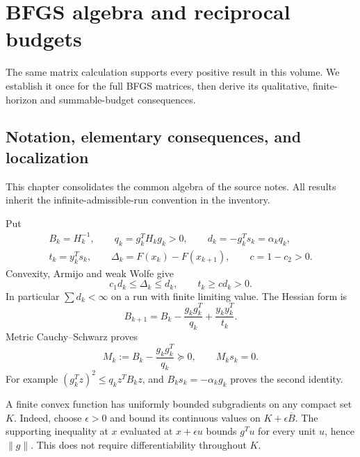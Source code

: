 \chapter{BFGS algebra and reciprocal budgets}\label{comp:M}\label{M:chapter}
\renewcommand{\ModuleTag}{2}
The same matrix calculation supports every positive result in this volume. We establish it once for the full BFGS matrices, then derive its qualitative, finite-horizon and summable-budget consequences.


\section{Notation, elementary consequences, and localization}
\label{M:notation}
This chapter consolidates the common algebra of the source notes. All results inherit the infinite-admissible-run convention in the inventory.

Put
\[
 \begin{gathered}
 B_k=H_k^{-1},\qquad q_k=g_k^TH_kg_k>0,\qquad d_k=-g_k^Ts_k=\alpha_kq_k,\\
 t_k=y_k^Ts_k,\qquad\Delta_k=F(x_k)-F(x_{k+1}),\qquad c=1-c_2>0.
 \end{gathered}
\]
Convexity, Armijo and weak Wolfe give
\begin{equation}\label{M:basic}
 c_1d_k\le\Delta_k\le d_k,\qquad t_k\ge c d_k>0.
\end{equation}
In particular $\sum d_k<\infty$ on a run with finite limiting value. The Hessian form is
\begin{equation}\label{M:hessian}
 B_{k+1}=B_k-\frac{g_kg_k^T}{q_k}+\frac{y_ky_k^T}{t_k}.
\end{equation}
Metric Cauchy--Schwarz proves
\begin{equation}\label{M:annihilation}
 M_k:=B_k-\frac{g_kg_k^T}{q_k}\succeq0,\qquad M_ks_k=0.
\end{equation}
For example $(g_k^Tz)^2\le q_k z^TB_kz$, and $B_ks_k=-\alpha_kg_k$ proves the second identity.

A finite convex function has uniformly bounded subgradients on any compact set $K$. Indeed, choose $\epsilon>0$ and bound its continuous values on $K+\epsilon\overline B$. The supporting inequality at $x$ evaluated at $x+\epsilon u$ bounds $g^Tu$ for every unit $u$, hence $\|g\|$. This does not require differentiability throughout $K$.

